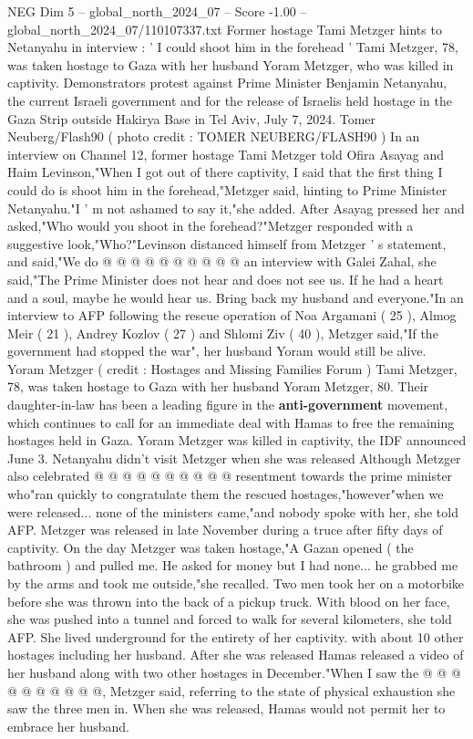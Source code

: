 \begin{textsample}{NEG Dim 5 – global\_north\_2024\_07 – Score -1.00 – global\_north\_2024\_07/110107337.txt}  \label{ex:f5_neg_146}
Former hostage Tami Metzger hints to Netanyahu in interview : ' I could shoot him in the forehead ' Tami Metzger, 78, was taken hostage to Gaza with her husband Yoram Metzger, who was killed in captivity.
Demonstrators protest against Prime Minister Benjamin Netanyahu, the current Israeli government and for the release of Israelis held hostage in the Gaza Strip outside Hakirya Base in Tel Aviv, July 7, 2024.
Tomer Neuberg/Flash90 ( photo credit : TOMER NEUBERG/FLASH90 ) In an interview on Channel 12, former hostage Tami Metzger told Ofira Asayag and Haim Levinson,"When I got out of there captivity, I said that the first thing I could do is shoot him in the forehead,"Metzger said, hinting to Prime Minister Netanyahu."I ' m not ashamed to say it,"she added.
After Asayag pressed her and asked,"Who would you shoot in the forehead?"Metzger responded with a suggestive look,"Who?"Levinson distanced himself from Metzger ' s statement, and said,"We do @ @ @ @ @ @ @ @ @ @ an interview with Galei Zahal, she said,"The Prime Minister does not hear and does not see us.
If he had a heart and a soul, maybe he would hear us.
Bring back my husband and everyone."In an interview to AFP following the rescue operation of Noa Argamani ( 25 ), Almog Meir ( 21 ), Andrey Kozlov ( 27 ) and Shlomi Ziv ( 40 ), Metzger said,"If the government had stopped the war", her husband Yoram would still be alive.
Yoram Metzger ( credit : Hostages and Missing Families Forum ) Tami Metzger, 78, was taken hostage to Gaza with her husband Yoram Metzger, 80.
Their daughter-in-law has been a leading figure in the \textbf{anti-government} movement, which continues to call for an immediate deal with Hamas to free the remaining hostages held in Gaza.
Yoram Metzger was killed in captivity, the IDF announced June 3.
Netanyahu didn't visit Metzger when she was released Although Metzger also celebrated @ @ @ @ @ @ @ @ @ @ resentment towards the prime minister who"ran quickly to congratulate them the rescued hostages,"however"when we were released... none of the ministers came,"and nobody spoke with her, she told AFP.
Metzger was released in late November during a truce after fifty days of captivity.
On the day Metzger was taken hostage,"A Gazan opened ( the bathroom ) and pulled me.
He asked for money but I had none... he grabbed me by the arms and took me outside,"she recalled.
Two men took her on a motorbike before she was thrown into the back of a pickup truck.
With blood on her face, she was pushed into a tunnel and forced to walk for several kilometers, she told AFP.
She lived underground for the entirety of her captivity. with about 10 other hostages including her husband.
After she was released Hamas released a video of her husband along with two other hostages in December."When I saw the @ @ @ @ @ @ @ @ @ @, Metzger said, referring to the state of physical exhaustion she saw the three men in.
When she was released, Hamas would not permit her to embrace her husband.

\end{textsample}
